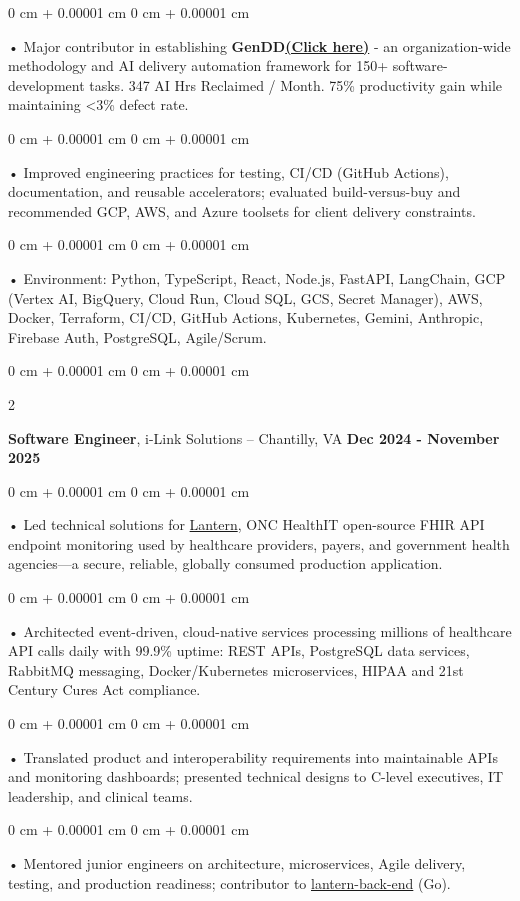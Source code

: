 \documentclass[10pt, letterpaper]{article}
\newenvironment{onecolentry}{
    \begin{adjustwidth}{
        0 cm + 0.00001 cm
    }{
        0 cm + 0.00001 cm
    }
}{
    \end{adjustwidth}
} %
\newenvironment{twocolentry}[2][]{
    \onecolentry
    \def\secondColumn{#2}
    \setcolumnwidth{\fill, 4.5 cm}
    \begin{paracol}{2}
}{
    \switchcolumn \raggedleft \secondColumn
    \end{paracol}
    \endonecolentry
} %
\begin{document}
        \begin{onecolentry}
             • Major contributor in establishing \textbf{GenDD}\href{https://hatchworks.com/generative-driven-development/}{\textbf{(Click here)}} - an organization-wide methodology and AI delivery automation framework for 150+ software-development tasks. 347 AI Hrs Reclaimed / Month. 75\% productivity gain while maintaining <3\% defect rate.
        \end{onecolentry}
        \begin{onecolentry}
             • Improved engineering practices for testing, CI/CD (GitHub Actions), documentation, and reusable accelerators; evaluated build-versus-buy and recommended GCP, AWS, and Azure toolsets for client delivery constraints.
        \end{onecolentry}
        \begin{onecolentry}
             • Environment: Python, TypeScript, React, Node.js, FastAPI, LangChain, GCP (Vertex AI, BigQuery, Cloud Run, Cloud SQL, GCS, Secret Manager), AWS, Docker, Terraform, CI/CD, GitHub Actions, Kubernetes, Gemini, Anthropic, Firebase Auth, PostgreSQL, Agile/Scrum.
        \end{onecolentry}

        \vspace{0.1cm}

        \begin{twocolentry}{
            \textbf{Dec 2024 - November 2025}
        }
            \textbf{Software Engineer}, i-Link Solutions -- Chantilly, VA\end{twocolentry}


        \begin{onecolentry}
             • Led technical solutions for \href{https://lantern.healthit.gov/?tab=dashboard_tab}{Lantern}, ONC HealthIT open-source FHIR API endpoint monitoring used by healthcare providers, payers, and government health agencies---a secure, reliable, globally consumed production application.
        \end{onecolentry}
        \begin{onecolentry}
             • Architected event-driven, cloud-native services processing millions of healthcare API calls daily with 99.9\% uptime: REST APIs, PostgreSQL data services, RabbitMQ messaging, Docker/Kubernetes microservices, HIPAA and 21st Century Cures Act compliance.
        \end{onecolentry}
        \begin{onecolentry}
             • Translated product and interoperability requirements into maintainable APIs and monitoring dashboards; presented technical designs to C-level executives, IT leadership, and clinical teams.
        \end{onecolentry}
        \begin{onecolentry}
             • Mentored junior engineers on architecture, microservices, Agile delivery, testing, and production readiness; contributor to \href{https://github.com/onc-healthit/lantern-back-end}{lantern-back-end} (Go).
        \end{onecolentry}
\end{document}
